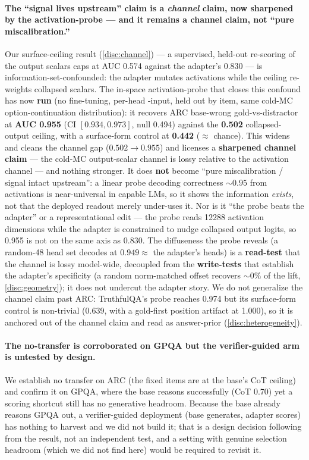 \paragraph{The ``signal lives upstream'' claim is a \emph{channel} claim, now
sharpened by the activation-probe --- and it remains a channel claim, not ``pure
miscalibration.''}
Our surface-ceiling result (\cref{disc:channel}) --- a supervised, held-out
re-scoring of the output scalars caps at AUC 0.574 against the adapter's 0.830 ---
is information-set-confounded: the adapter mutates activations while the ceiling
re-weights collapsed scalars. The in-space activation-probe that closes this
confound has now \textbf{run} (no fine-tuning, per-head -input, held
out by item, same cold-MC option-continuation distribution): it recovers ARC
base-wrong gold-vs-distractor at \textbf{AUC 0.955} (CI $[0.934, 0.973]$, null
0.494) against the \textbf{0.502} collapsed-output ceiling, with a surface-form
control at \textbf{0.442} (${\approx}$ chance). This widens and cleans the channel
gap ($0.502{\rightarrow}0.955$) and licenses a \textbf{sharpened channel claim} ---
the cold-MC output-scalar channel is lossy relative to the activation channel ---
and nothing stronger. It does \textbf{not} become ``pure miscalibration / signal
intact upstream'': a linear probe decoding correctness ${\sim}0.95$ from
activations is near-universal in capable LMs, so it shows the information
\emph{exists}, not that the deployed readout merely under-uses it. Nor is it ``the
probe beats the adapter'' or a representational edit --- the probe reads 12288
activation dimensions while the adapter is constrained to nudge collapsed output
logits, so 0.955 is not on the same axis as 0.830. The diffuseness the probe
reveals (a random-48 head set decodes at $\mathbf{0.949 \approx}$ the adapter's
heads) is a \textbf{read-test} that the channel is lossy model-wide, decoupled from
the \textbf{write-tests} that establish the adapter's specificity (a random
norm-matched offset recovers ${\sim}0\%$ of the lift, \cref{disc:geometry}); it
does not undercut the adapter story. We do not generalize the channel claim past
ARC: TruthfulQA's probe reaches 0.974 but its surface-form control is non-trivial
(0.639, with a gold-first position artifact at 1.000), so it is anchored out of the
channel claim and read as answer-prior (\cref{disc:heterogeneity}).

\paragraph{The no-transfer is corroborated on GPQA but the verifier-guided arm is
untested by design.}
We establish no transfer on ARC (the fixed items are at the base's CoT ceiling) and
confirm it on GPQA, where the base reasons successfully (CoT 0.70) yet a scoring
shortcut still has no generative headroom. Because the base already reasons GPQA
out, a verifier-guided deployment (base generates, adapter scores) has nothing to
harvest and we did not build it; that is a design decision following from the
result, not an independent test, and a setting with genuine selection headroom
(which we did not find here) would be required to revisit it.

